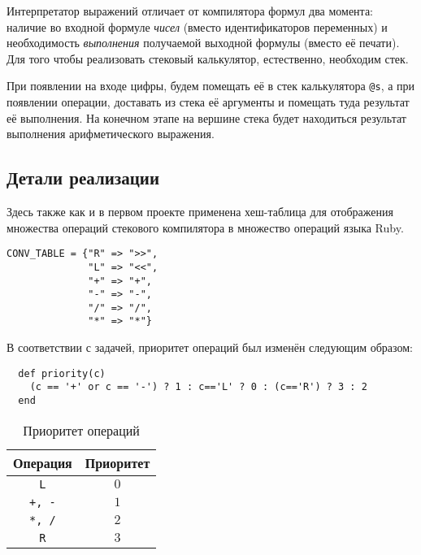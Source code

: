Интерпретатор выражений отличает от компилятора формул два момента: наличие во
входной формуле \emph{чисел} (вместо идентификаторов переменных) и необходимость
\emph{выполнения} получаемой выходной формулы (вместо её печати). Для того чтобы
реализовать стековый калькулятор, естественно, необходим стек.

При появлении на входе цифры, будем помещать её в стек калькулятора \verb|@s|,
а при появлении операции, доставать из стека её аргументы и помещать туда результат
её выполнения. На конечном этапе на вершине стека будет находиться результат
выполнения арифметического выражения.

\subsection{Детали реализации}
Здесь также как и в первом проекте применена хеш-таблица для отображения множества
операций стекового компилятора в множество операций языка Ruby.
\begin{lstlisting}
CONV_TABLE = {"R" => ">>",
              "L" => "<<",
              "+" => "+",
              "-" => "-",
              "/" => "/",
              "*" => "*"}
\end{lstlisting}
В соответствии с задачей, приоритет операций был изменён следующим образом:
\begin{lstlisting}
  def priority(c)
    (c == '+' or c == '-') ? 1 : c=='L' ? 0 : (c=='R') ? 3 : 2
  end
\end{lstlisting}
\begin{table}[ht!]
\caption{Приоритет операций}
\begin{center}
\begin{tabular}{|c|c|}
\hline
Операция & Приоритет \\
\hline
\verb|L| & $0$ \\
\hline
\verb|+, -| & $1$ \\
\hline
\verb|*, /| & $2$ \\
\hline
\verb|R| & $3$ \\
\hline
\end{tabular}
\end{center}
\end{table}
\newpage
